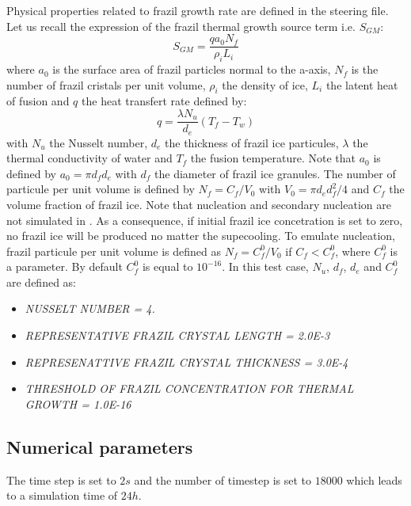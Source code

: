 Physical properties related to frazil growth rate are defined in the \khione steering file. Let us recall
the expression of the frazil thermal growth source term i.e. $S_{GM}$:
\begin{equation}
S_{GM} = \dfrac{q a_0 N_f}{\rho_i L_i}
\end{equation}
where $a_0$ is the surface area of frazil particles normal to the a-axis, $N_f$ is the number of frazil cristals 
per unit volume, $\rho_i$ the density of ice, $L_i$ the latent heat of fusion and $q$ the heat transfert rate 
defined by:
\begin{equation}
q = \dfrac{\lambda N_u}{d_e} (T_f-T_w)
\end{equation}
with $N_u$ the Nusselt number, $d_e$ the thickness of frazil ice particules, $\lambda$ the thermal conductivity of water and $T_f$ the fusion temperature. Note that $a_0$ is defined by $a_0 = \pi d_f d_e$ with $d_f$ the diameter of frazil ice granules. The number of particule per unit volume is defined by $N_f=C_f/V_0$ with $V_0=\pi d_e d_f^2/4$ and $C_f$ the volume fraction of frazil ice. Note that nucleation and secondary nucleation are not simulated in \khione. As a consequence, if initial frazil ice concetration is set to zero, no frazil ice will be produced no matter the supecooling.
To emulate nucleation, frazil particule per unit volume is defined as $N_f=C^0_f/V_0$ if $C_f<C^0_f$, where
$C^0_f$ is a parameter. By default $C^0_f$ is equal to $10^{-16}$. In this test case, $N_u$, $d_f$, $d_e$ and $C^0_f$ are defined as:
\begin{itemize}
	\item\textit{NUSSELT NUMBER = 4.}
	\item\textit{REPRESENTATIVE FRAZIL CRYSTAL LENGTH = 2.0E-3}
	\item\textit{REPRESENATTIVE FRAZIL CRYSTAL THICKNESS = 3.0E-4}
	\item\textit{THRESHOLD OF FRAZIL CONCENTRATION FOR THERMAL GROWTH = 1.0E-16}	
\end{itemize}

\subsection{Numerical parameters}
The time step is set to $2s$ and the number of timestep is set to $18000$ which leads to a simulation time of $24h$.

